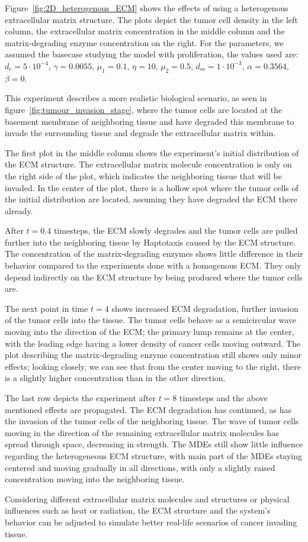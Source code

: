 Figure~\ref{fig:2D_heterogenous_ECM} shows the effects of using a heterogenous extracellular matrix structure. The plots depict the tumor cell density in the left column, the extracellular matrix concentration in the middle column and the matrix-degrading enzyme concentration on the right. For the parameters, we assumed the basecase studying the model with proliferation, the values used are: $d_c=5\cdot 10^{-4}$, $\gamma=0.0055$, $\mu_1 = 0.1$, $\eta=10$, $\mu_2=0.5$, $d_m = 1\cdot 10^{-3}$, $\alpha = 0.3564$, $\beta = 0$.

This experiment describes a more realistic biological scenario, as seen in figure~\ref{fig:tumour_invasion_stage}, where the tumor cells are located at the basement membrane of neighboring tissue and have degraded this membrane to invade the surrounding tissue and degrade the extracellular matrix within.

The first plot in the middle column shows the experiment's initial distribution of the ECM structure. The extracellular matrix molecule concentration is only on the right side of the plot, which indicates the neighboring tissue that will be invaded. In the center of the plot, there is a hollow spot where the tumor cells of the initial distribution are located, assuming they have degraded the ECM there already.

After $t=0.4$ timesteps, the ECM slowly degrades and the tumor cells are pulled further into the neighboring tissue by Haptotaxis caused by the ECM structure. The concentration of the matrix-degrading enzymes shows little difference in their behavior compared to the experiments done with a homogenous ECM. They only depend indirectly on the ECM structure by being produced where the tumor cells are. 

The next point in time $t=4$ shows increased ECM degradation, further invasion of the tumor cells into the tissue. The tumor cells behave as a semicircular wave moving into the direction of the ECM; the primary lump remains at the center, with the leading edge having a lower density of cancer cells moving outward. The plot describing the matrix-degrading enzyme concentration still shows only minor effects; looking closely, we can see that from the center moving to the right, there is a slightly higher concentration than in the other direction.

The last row depicts the experiment after $t=8$ timesteps and the above mentioned effects are propagated. The ECM degradation has continued, as has the invasion of the tumor cells of the neighboring tissue. The wave of tumor cells moving in the direction of the remaining extracellular matrix molecules has spread through space, decreasing in strength. The MDEs still show little influence regarding the heterogeneous ECM structure, with main part of the MDEs staying centered and moving gradually in all directions, with only a slightly raised concentration moving into the neighboring tissue.
 
Considering different extracellular matrix molecules and structures or physical influences such as heat or radiation, the ECM structure and the system's behavior can be adjusted to simulate better real-life scenarios of cancer invading tissue.
